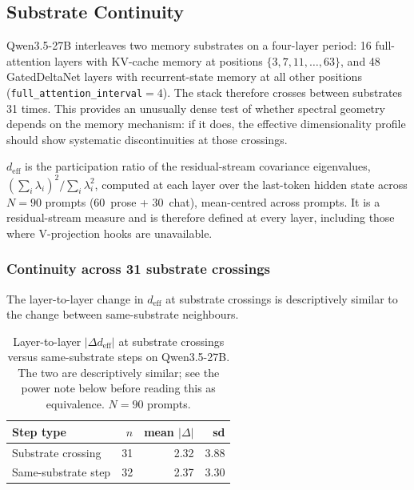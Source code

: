 %

\subsection{Substrate Continuity}
\label{sec:substrate}

Qwen3.5-27B interleaves two memory substrates on a four-layer period:
16 full-attention layers with KV-cache memory at positions
$\{3,7,11,\ldots,63\}$, and 48 GatedDeltaNet layers with
recurrent-state memory at all other positions
(\texttt{full\_attention\_interval}${=}4$). The stack therefore
crosses between substrates 31 times. This provides an unusually
dense test of whether spectral geometry depends on the memory
mechanism: if it does, the effective dimensionality profile should
show systematic discontinuities at those crossings.

$d_\text{eff}$ is the participation ratio of the residual-stream
covariance eigenvalues, $(\sum_i \lambda_i)^2 / \sum_i \lambda_i^2$,
computed at each layer over the last-token hidden state across
$N{=}90$ prompts (60~prose + 30~chat), mean-centred across prompts.
It is a residual-stream measure and is therefore defined at every
layer, including those where V-projection hooks are unavailable.

\subsubsection{Continuity across 31 substrate crossings}

The layer-to-layer change in $d_\text{eff}$ at substrate crossings is
descriptively similar to the change between same-substrate neighbours.

\begin{table}[ht]
\centering
\small
\caption{Layer-to-layer $|\Delta d_\text{eff}|$ at substrate crossings
versus same-substrate steps on Qwen3.5-27B. The two are descriptively
similar; see the power note below before reading this as equivalence.
$N{=}90$ prompts.}
\label{tab:crossings}
\begin{tabular}{lrrr}
\toprule
\textbf{Step type} & \textbf{$n$} & \textbf{mean $|\Delta|$} & \textbf{sd} \\
\midrule
Substrate crossing      & 31 & 2.32 & 3.88 \\
Same-substrate step     & 32 & 2.37 & 3.30 \\
\bottomrule
\end{tabular}
\end{table}

